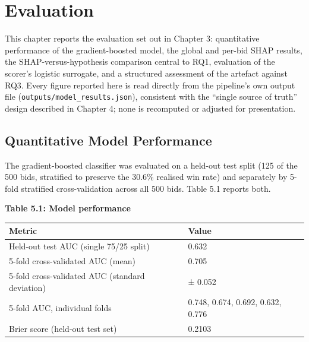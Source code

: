 \hypertarget{evaluation}{%
\chapter{Evaluation}\label{evaluation}}

This chapter reports the evaluation set out in Chapter 3: quantitative
performance of the gradient-boosted model, the global and per-bid SHAP
results, the SHAP-versus-hypothesis comparison central to RQ1,
evaluation of the scorer's logistic surrogate, and a structured
assessment of the artefact against RQ3. Every figure reported here is
read directly from the pipeline's own output file
(\texttt{outputs/model\_results.json}), consistent with the ``single
source of truth'' design described in Chapter 4; none is recomputed or
adjusted for presentation.

\hypertarget{quantitative-model-performance}{%
\section{Quantitative Model
Performance}\label{quantitative-model-performance}}

The gradient-boosted classifier was evaluated on a held-out test split
(125 of the 500 bids, stratified to preserve the 30.6\% realised win
rate) and separately by 5-fold stratified cross-validation across all
500 bids. Table 5.1 reports both.

\textbf{Table 5.1: Model performance}

\begin{longtable}[]{@{}ll@{}}
\toprule\noalign{}
Metric & Value \\
\midrule\noalign{}
\endhead
\bottomrule\noalign{}
\endlastfoot
Held-out test AUC (single 75/25 split) & 0.632 \\
5-fold cross-validated AUC (mean) & 0.705 \\
5-fold cross-validated AUC (standard deviation) & ± 0.052 \\
5-fold AUC, individual folds & 0.748, 0.674, 0.692, 0.632, 0.776 \\
Brier score (held-out test set) & 0.2103 \\
\end{longtable}

